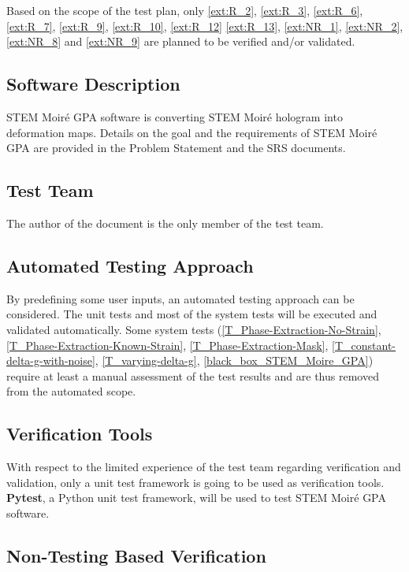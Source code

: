 \documentclass[12pt, titlepage]{article}
\newcommand{\progname}{STEM Moir{\'e} GPA}
\begin{document}
Based on the scope of the test plan, only \cref{ext:R_2}, \cref{ext:R_3}, \cref{ext:R_6}, \cref{ext:R_7}, \cref{ext:R_9}, \cref{ext:R_10}, \cref{ext:R_12} \cref{ext:R_13}, \cref{ext:NR_1}, \cref{ext:NR_2}, \cref{ext:NR_8} and \cref{ext:NR_9} are planned to be verified and/or validated. 
	
\subsection{Software Description}

\progname{} software is converting STEM Moir{\'e} hologram into deformation maps. Details on the goal and the requirements of \progname{} are provided in the Problem Statement and the SRS documents.

\subsection{Test Team}

The author of the document is the only member of the test team.

\subsection{Automated Testing Approach}

By predefining some user inputs, an automated testing approach can be considered. The unit tests and most of the system tests will be executed and validated automatically. Some system tests (\cref{T_Phase-Extraction-No-Strain}, \cref{T_Phase-Extraction-Known-Strain}, \cref{T_Phase-Extraction-Mask}, \cref{T_constant-delta-g-with-noise}, \cref{T_varying-delta-g}, \cref{black_box_STEM_Moire_GPA}) require at least a manual assessment of the test results and are thus removed from the automated scope. 

\subsection{Verification Tools}

With respect to the limited experience of the test team regarding verification and validation, only a unit test framework is going to be used as verification tools. \textbf{Pytest}, a Python unit test framework, will be used to test \progname{} software.

\subsection{Non-Testing Based Verification}
\end{document}
